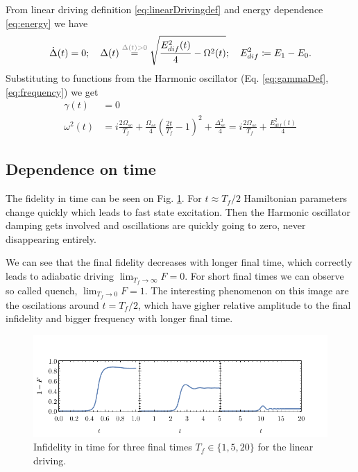 From linear driving definition \ref{eq:linearDrivingdef} and energy dependence \ref{eq:energy} we have
\begin{equation}
    \dot \Delta(t)=0;\quad \Delta(t) \overset{\textcolor{gray}{\Delta(t)>0}}{=} \sqrt{\frac{E^2_{dif}(t)}{4}-\Omega^2(t)};\quad E^2_{dif}\coloneqq E_1-E_0.
\end{equation}
Substituting to functions from the Harmonic oscillator (Eq. \ref{eq:gammaDef}, \ref{eq:frequency}) we get 
\begin{align}
    \gamma(t) &= 0\\
    \omega^2(t)&=i\frac{2\Omega_{sc}}{T_f}+\frac{\Omega_{sc}}{4}\left(\frac{2t}{T_f}-1\right)^2+\frac{\Delta_{sc}^2}{4}=i\frac{2\Omega_{sc}}{T_f}+\frac{E^2_{dif}(t)}{4}\label{eq:oscillationsLinear}
\end{align}


\subsection{Dependence on time}
The fidelity in time can be seen on Fig. \ref{fig:infidelityTimePlotLin}. For $t\approx T_f/2$ Hamiltonian parameters change quickly which leads to fast state excitation. Then the Harmonic oscillator damping gets involved and oscillations are quickly going to zero, never disappearing entirely.

We can see that the final fidelity decreases with longer final time, which correctly leads to adiabatic driving $\lim_{T_f\rightarrow \infty} F=0$. For short final times we can observe so called quench, $\lim_{T_f\rightarrow 0} F=1$. The interesting phenomenon on this image are the oscilations around $t=T_f/2$, which have gigher relative amplitude to the final infidelity and bigger frequency with longer final time. 

\begin{figure}[H]
    \centering 
    \includegraphics[scale=1.185]{../img/infidelityInTimePlot1.pdf}
    \caption{Infidelity in time for three final times $T_f\in\{1,5,20\}$ for the linear driving.}
  \label{fig:infidelityTimePlotLin}
\end{figure}


